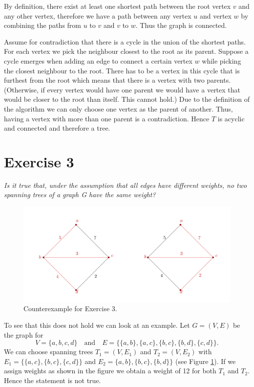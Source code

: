 \documentclass{article}
\begin{document}
By definition, there exist at least one shortest path between the root vertex $v$ and any other vertex, therefore we have a path between any vertex $u$ and vertex $w$ by combining the paths from $u$ to $v$ and $v$ to $w$. Thus the graph is connected.

Assume for contradiction that there is a cycle in the union of the shortest paths. For each vertex we pick the neighbour closest to the root as its parent. Suppose a cycle emerges when adding an edge to connect a certain vertex $w$ while picking the closest neighbour to the root. There has to be a vertex in this cycle that is furthest from the root which means that there is a vertex with two parents. (Otherwise, if every vertex would have one parent we would have a vertex that would be closer to the root than itself. This cannot hold.) Due to the definition of the algorithm we can only choose one vertex as the parent of another. 
Thus, having a vertex with more than one parent is a contradiction. Hence $T$ is acyclic and connected and therefore a tree.

\section*{Exercise 3}

\emph{Is it true that, under the assumption that all edges have different weights, no two spanning trees of a graph G have the same weight?}
\vspace{0.4cm}

\begin{figure}[h]
    \centering
    \includegraphics{graphics/L6_prim_kruskal_dijkstra/Ex_3_project.png}
       \caption{Counterexample for Exercise 3.}
    \label{ex_3}
\end{figure}
To see that this does not hold we can look at an example. Let $G=(V,E)$ be the graph for
$$V = \{a,b,c,d\}\quad\text{and}\quad E = \{ \{a,b\}, \{a,c\}, \{b,c\}, \{b,d\}, \{c,d\} \}.$$ 
We can choose spanning trees $T_1 = (V, E_1)$ and $T_2 = (V, E_2)$ with $E_1 = \{ \{a,c\}, \{b,c\}, \{c,d\} \}$ and $E_2=\{a,b\}, \{b,c\}, \{b,d\} \}$ (see Figure \ref{ex_3}). If we assign weights as shown in the figure we obtain a weight of 12 for both $T_1$ and $T_2$. Hence the statement is not true.
\end{document}
